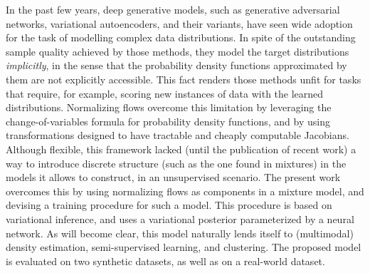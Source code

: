 In the past few years, deep generative models, such as generative adversarial networks,
variational autoencoders, and their variants, have seen wide adoption for the task
of modelling complex data distributions. In spite of the outstanding sample quality
achieved by those methods, they model the target distributions \emph{implicitly},
in the sense that the probability density functions approximated by them are not
explicitly accessible. This fact renders those methods unfit for
tasks that require, for example, scoring new instances of data with the learned
distributions. Normalizing flows overcome this limitation by leveraging the
change-of-variables formula for probability density functions, and by using
transformations designed to have tractable and cheaply computable Jacobians. Although
flexible, this framework lacked (until the publication of recent work) a way to introduce discrete
structure (such as the one found in mixtures) in the models it allows to
construct, in an unsupervised scenario. The present work overcomes this by using normalizing flows as components in a mixture model,
and devising a training procedure for such a model.
This procedure is based on variational inference, and uses a variational posterior
parameterized by a neural network. As will become clear, this model naturally
lends itself to (multimodal) density estimation, semi-supervised learning, and
clustering. The proposed model is evaluated on two synthetic datasets, as well
as on a real-world dataset.
